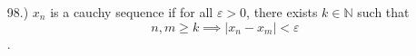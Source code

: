 \documentclass[12pt]{article}
\newcommand{\vertb}[1]{\left\vert#1\right\vert}
\begin{document}
\begin{itemize}














    \item [98.)] $x_n$ is a cauchy sequence if for all $\varepsilon>0$, there exists $k\in\mathbb{N}$ such that
    \[n,m\geq k\implies\vertb{x_n-x_m}<\varepsilon\].











\end{itemize}
\end{document}
